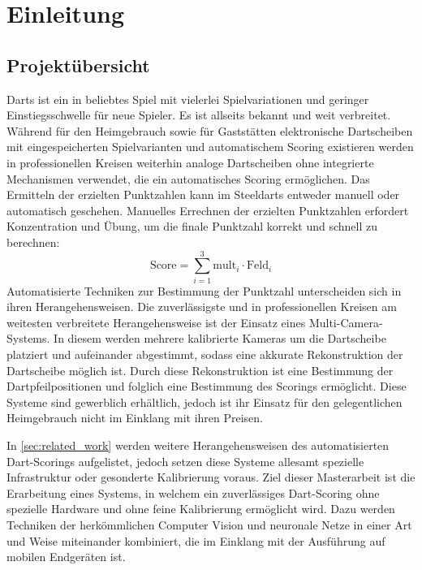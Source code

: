 
\chapter{Einleitung}
\label{cha:einleitung}



\section{Projektübersicht}
\label{sec:projektuebersicht}

Darts ist ein in beliebtes Spiel mit vielerlei Spielvariationen und geringer Einstiegsschwelle für neue Spieler. Es ist allseits bekannt und weit verbreitet. Während für den Heimgebrauch sowie für Gaststätten elektronische Dartscheiben mit eingespeicherten Spielvarianten und automatischem Scoring existieren werden in professionellen Kreisen weiterhin analoge Dartscheiben ohne integrierte Mechanismen verwendet, die ein automatisches Scoring ermöglichen. Das Ermitteln der erzielten Punktzahlen kann im Steeldarts entweder manuell oder automatisch geschehen. Manuelles Errechnen der erzielten Punktzahlen erfordert Konzentration und Übung, um die finale Punktzahl korrekt und schnell zu berechnen:
\[ \text{Score} = \sum_{i=1}^{3} \text{mult}_i \cdot \text{Feld}_i \]
Automatisierte Techniken zur Bestimmung der Punktzahl unterscheiden sich in ihren Herangehensweisen. Die zuverlässigste und in professionellen Kreisen am weitesten verbreitete Herangehensweise ist der Einsatz eines Multi-Camera-Systems. In diesem werden mehrere kalibrierte Kameras um die Dartscheibe platziert und aufeinander abgestimmt, sodass eine akkurate Rekonstruktion der Dartscheibe möglich ist. Durch diese Rekonstruktion ist eine Bestimmung der Dartpfeilpositionen und folglich eine Bestimmung des Scorings ermöglicht. Diese Systeme sind gewerblich erhältlich, jedoch ist ihr Einsatz für den gelegentlichen Heimgebrauch nicht im Einklang mit ihren Preisen.

In \autoref{sec:related_work} werden weitere Herangehensweisen des automatisierten Dart-Scorings aufgelistet, jedoch setzen diese Systeme allesamt spezielle Infrastruktur oder gesonderte Kalibrierung voraus. Ziel dieser Masterarbeit ist die Erarbeitung eines Systems, in welchem ein zuverlässiges Dart-Scoring ohne spezielle Hardware und ohne feine Kalibrierung ermöglicht wird. Dazu werden Techniken der herkömmlichen Computer Vision und neuronale Netze in einer Art und Weise miteinander kombiniert, die im Einklang mit der Ausführung auf mobilen Endgeräten ist.

